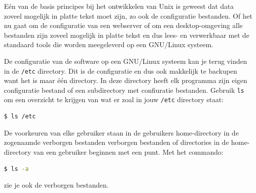 E\'en van de basis principes bij het ontwikkelen van Unix is geweest dat data zoveel mogelijk in platte tekst moet zijn, zo ook de configuratie bestanden. Of het nu gaat om de configuratie van een webserver of om een desktop-omgeving alle bestanden zijn zoveel mogelijk in platte tekst en dus lees- en verwerkbaar met de standaard tools die worden meegeleverd op een GNU/Linux systeem.

De configuratie van de software op een GNU/Linux systeem kan je terug vinden in de \texttt{/etc} directory. Dit is de  configuratie en dus ook makkelijk te backupen want het is maar \'e\'en directory. In deze directory heeft elk programma zijn eigen configuratie bestand of een subdirectory met confiuratie bestanden. Gebruik \texttt{ls} om een overzicht te krijgen van wat er zoal in jouw \texttt{/etc} directory staat:
\begin{lstlisting}[language=bash]
$ ls /etc
\end{lstlisting}

De voorkeuren van elke gebruiker staan in de gebruikers home-directory in de zogenaamde verborgen bestanden verborgen bestanden of directories in de home-directory van een gebruiker beginnen met een punt. Met het commando:
\begin{lstlisting}[language=bash]
$ ls -a
\end{lstlisting}
zie je ook de verborgen bestanden.

